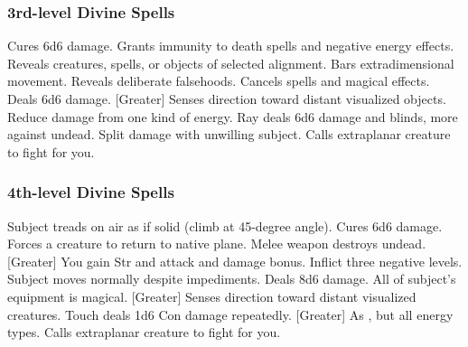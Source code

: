 \subsubsection{3rd-level Divine Spells}
\begin{spelllist}
     Cures 6d6 damage.
     Grants immunity to death spells and negative energy effects.
     Reveals creatures, spells, or objects of selected alignment.
     Bars extradimensional movement.
     Reveals deliberate falsehoods.
     Cancels spells and magical effects.
     Deals 6d6 damage.
    [Greater] Senses direction toward distant visualized objects.
     Reduce damage from one kind of energy.
     Ray deals 6d6 damage and blinds, more against undead.
      Split damage with unwilling subject.
     Calls extraplanar creature to fight for you.
\end{spelllist}

\subsubsection{4th-level Divine Spells}
\begin{spelllist}
     Subject treads on air as if solid (climb at 45-degree angle).
     Cures 6d6 damage.
     Forces a creature to return to native plane.
     Melee weapon destroys undead.
    [Greater] You gain  Str and attack and damage bonus.
     Inflict three negative levels.
     Subject moves normally despite impediments.
     Deals 8d6 damage.
     All of subject's equipment is magical.
    [Greater] Senses direction toward distant visualized creatures.
     Touch deals 1d6 Con damage repeatedly.
    [Greater] As , but all energy types.
     Calls extraplanar creature to fight for you.
\end{spelllist}

